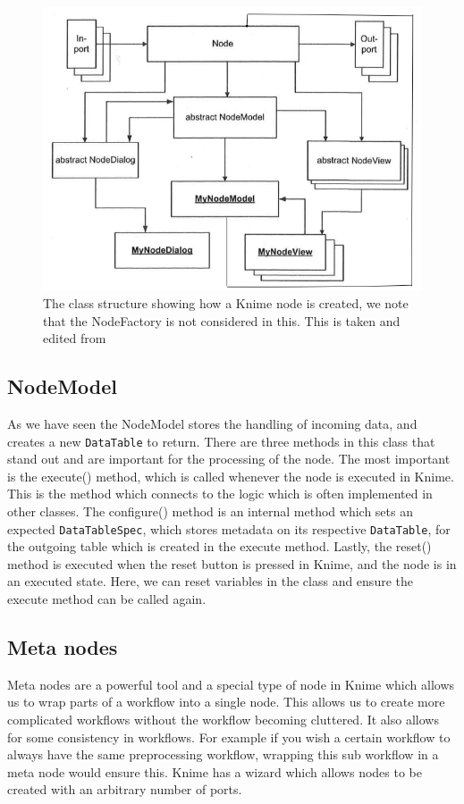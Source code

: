 \documentclass[11pt,openany]{book}
\begin{document}
\begin{figure}[H]
    \centering
    \includegraphics[scale=0.3]{./images/knime_data_structure.png}
    \caption{The class structure showing how a Knime node is created, we note that the NodeFactory is not considered in this. This is taken and edited from \cite{KNIME_Basic_info}}
    \label{fig:knime_node_class_structures}
\end{figure}

\subsection{NodeModel}
As we have seen the NodeModel stores the handling of incoming data, and creates a new \texttt{DataTable} to return. There are three methods in this class that stand out and are important for the processing of the node. The most important is the execute() method, which is called whenever the node is executed in Knime. This is the method which connects to the logic which is often implemented in other classes. The configure() method is an internal method which sets an expected \texttt{DataTableSpec}, which stores metadata on its respective \texttt{DataTable}, for the outgoing table which is created in the execute method. Lastly, the reset() method is executed when the reset button is pressed in Knime, and the node is in an executed state. Here, we can reset variables in the class and ensure the execute method can be called again.

\subsection{Meta nodes}
Meta nodes are a powerful tool and a special type of node in Knime which allows us to wrap parts of a workflow into a single node. This allows us to create more complicated workflows without the workflow becoming cluttered. It also allows for some consistency in workflows. For example if you wish a certain workflow to always have the same preprocessing workflow, wrapping this sub workflow in a meta node would ensure this. Knime has a wizard which allows nodes to be created with an arbitrary number of ports. 
\end{document}
